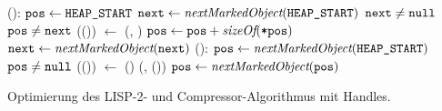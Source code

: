 \begin{algorithm}
\begin{algorithmic}[1]
	\State {}():	
	\State \quad $\texttt{pos} \gets \texttt{HEAP\_START}$
	\State \quad $\texttt{next} \gets \textit{nextMarkedObject}(\texttt{HEAP\_START})$
	\State \quad \WHILE $\texttt{next} \neq \texttt{null}$			
	\State \quad \quad \IF $\texttt{pos} \neq \texttt{next}$
	\State \quad \quad \quad {}(()) $\gets$ 	
	\State \quad \quad \quad {}(, )
	\State \quad \quad $\texttt{pos} \gets \texttt{pos} + \textit{sizeOf}(\texttt{*pos})$
	\State \quad \quad $\texttt{next} \gets \textit{nextMarkedObject}(\texttt{next})$
	\Statex
	\State {}():		
	\State \quad $\texttt{pos} \gets \textit{nextMarkedObject}(\texttt{HEAP\_START})$
	\State \quad \WHILE $\texttt{pos} \neq \texttt{null}$
	\State \quad \quad {}(()) $\gets$ ()	
	\State \quad \quad {}(, ())
	\State \quad \quad $\texttt{pos} \gets \textit{nextMarkedObject}(\texttt{pos})$
\end{algorithmic}
\caption[Optimierung der Kompaktierungsalgorithmen mit Handles]{Optimierung des LISP-2- und Compressor-Algorithmus mit Handles.}
\label{algo:handle-compaction}
\end{algorithm}